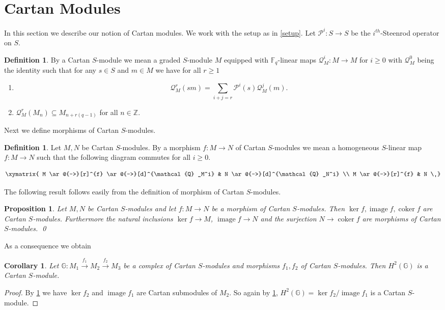 \documentclass{amsart}
\newcommand{\F}{\mathbb{F} }
\newcommand{\G}{\mathbb{G} }
\newcommand{\Z}{\mathbb{Z} }
\newcommand{\Pc}{\mathcal{P} }
\newcommand{\Qc}{\mathcal{Q} }
\newcommand{\rt}{\rightarrow}
\newcommand{\image}{\operatorname{image}}
\newcommand{\coker}{\operatorname{coker}}
\theoremstyle{plain}
\newtheorem{corollary}[theorem]{Corollary}
\newtheorem{proposition}[theorem]{Proposition}
\theoremstyle{definition}
\newtheorem{definition}[theorem]{Definition}
\theoremstyle{remark}
\begin{document}
\section{Cartan Modules}
In this section we describe our notion of Cartan modules. We work with the setup as in \ref{setup}. Let $\Pc^i \colon S \rt S$ be the $i^{th}$-Steenrod operator on $S$.

\begin{definition}
By a Cartan $S$-module we mean a graded $S$-module $M$ equipped with $\F_q$-linear maps $\Qc^i_M \colon M \rt M$ for $i \geq 0$ with $\Qc^0_M $ being the identity such that for any $s \in S$ and $m \in M$ we have for all $r \geq 1$
\begin{enumerate}
  \item $$ \Qc^r_M(sm) = \sum_{i+j = r}\Pc^i(s)\Qc^j_M(m).$$
  \item $\Qc^r_M(M_n) \subseteq M_{n + r(q-1)}$ for all $n \in \Z$.
\end{enumerate}
\end{definition}
Next we define morphisms of Cartan $S$-modules.
\begin{definition}\label{def-cart-morph}
  Let $M, N$ be Cartan $S$-modules. By a morphism $f \colon M \rt N$ of Cartan $S$-modules we mean a homogeneous $S$-linear map $f \colon M \rt N$ such that the following diagram commutes for all $i \geq 0$.

\[
  \xymatrix
{
M
\ar@{->}[r]^{f}
\ar@{->}[d]^{\Qc_M^i}
 & N
\ar@{->}[d]^{\Qc_N^i}
\\
M
\ar@{->}[r]^{f}
 & N
\
 }
\]
\end{definition}
The following result follows easily from the definition of morphism of Cartan $S$-modules.
\begin{proposition}
\label{kic} Let $M, N$ be Cartan $S$-modules and let $f \colon M \rt N$ be a morphism of Cartan $S$-modules. Then $\ker f, \image f, \coker f$ are Cartan $S$-modules. Furthermore the natural inclusions $\ker f \rt M$, $\image f \rt N$ and the surjection $N \rt \coker f$ are morphisms of Cartan $S$-modules. \qed
\end{proposition}
As a consequence we obtain
\begin{corollary}
\label{complex-cart} Let $\G \colon M_1 \xrightarrow{f_1} M_2 \xrightarrow{f_2} M_3$ be a complex of Cartan $S$-modules and morphisms $f_1, f_2$ of Cartan $S$-modules. Then $H^2(\G)$ is a Cartan $S$-module.
\end{corollary}
\begin{proof}
  By \ref{kic} we have $\ker f_2$ and $\image f_1$ are Cartan submodules of $M_2$. So again by \ref{kic}, $H^2(\G) = \ker f_2/\image f_1$ is a Cartan $S$-module.
\end{proof}
\end{document}
